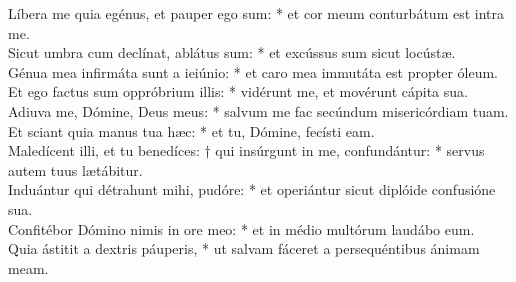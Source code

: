 {	Líbera me quia egénus, et pauper ego sum: * et cor meum conturbátum est intra me. \\
	Sicut umbra cum declínat, ablátus sum: * et excússus sum sicut locústæ. \\
	Génua mea infirmáta sunt a ieiúnio: * et caro mea immutáta est propter óleum. \\
	Et ego factus sum oppróbrium illis: * vidérunt me, et movérunt cápita sua. \\
	Adiuva me, Dómine, Deus meus: * salvum me fac secúndum misericórdiam tuam. \\
	Et sciant quia manus tua hæc: * et tu, Dómine, fecísti eam. \\
	Maledícent illi, et tu benedíces: † qui insúrgunt in me, confundántur: * servus autem tuus lætábitur. \\
	Induántur qui détrahunt mihi, pudóre: * et operiántur sicut diplóide confusióne sua. \\
	Confitébor Dómino nimis in ore meo: * et in médio multórum laudábo eum. \\
	Quia ástitit a dextris páuperis, * ut salvam fáceret a persequéntibus ánimam meam.
}


